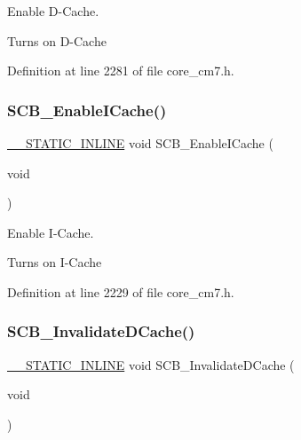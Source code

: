 Enable D-\/\+Cache. 

Turns on D-\/\+Cache 

Definition at line 2281 of file core\+\_\+cm7.\+h.

\mbox{\label{group___c_m_s_i_s___core___cache_functions_gaf9e7c6c8e16ada1f95e5bf5a03505b68}} 
\subsubsection{\texorpdfstring{S\+C\+B\+\_\+\+Enable\+I\+Cache()}{SCB\_EnableICache()}}
{\footnotesize\ttfamily \hyperlink{cmsis__iccarm_8h_aba87361bfad2ae52cfe2f40c1a1dbf9c}{\+\_\+\+\_\+\+S\+T\+A\+T\+I\+C\+\_\+\+I\+N\+L\+I\+NE} void S\+C\+B\+\_\+\+Enable\+I\+Cache (\begin{DoxyParamCaption}\item[{void}]{ }\end{DoxyParamCaption})}



Enable I-\/\+Cache. 

Turns on I-\/\+Cache 

Definition at line 2229 of file core\+\_\+cm7.\+h.

\mbox{\label{group___c_m_s_i_s___core___cache_functions_gace2d30db08887d0bdb818b8a785a5ce6}} 
\subsubsection{\texorpdfstring{S\+C\+B\+\_\+\+Invalidate\+D\+Cache()}{SCB\_InvalidateDCache()}}
{\footnotesize\ttfamily \hyperlink{cmsis__iccarm_8h_aba87361bfad2ae52cfe2f40c1a1dbf9c}{\+\_\+\+\_\+\+S\+T\+A\+T\+I\+C\+\_\+\+I\+N\+L\+I\+NE} void S\+C\+B\+\_\+\+Invalidate\+D\+Cache (\begin{DoxyParamCaption}\item[{void}]{ }\end{DoxyParamCaption})}



